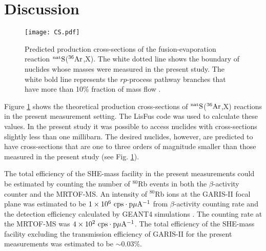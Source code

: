 \documentclass[3p]{elsarticle}
\begin{document}
\section{Discussion}

\begin{figure}[!t]
  \centering
  \texttt{[image: CS.pdf]}
  \caption{Predicted production cross-sections of the fusion-evaporation reaction $^{\rm nat}{\rm S}$($^{36}{\rm Ar}$,X). The white dotted line shows the boundary of nuclides whose masses were measured in the present study. The white bold line represents the $rp$-process pathway branches that have more than 10\% fraction of mass flow \citep{Schatz2001}. \label{CS}}
\end{figure} 

Figure \ref{CS} shows the theoretical production cross-sections of $^{\rm nat}{\rm S}$($^{36}{\rm Ar}$,X) reactions in the present measurement setting. The LisFus code \citep{Tarasov2003} was used to calculate these values. In the present study it was possible to access nuclides with cross-sections slightly less than one millibarn. The desired nuclides, however, are predicted to have cross-sections that are one to three orders of magnitude smaller than those measured in the present study (see Fig. \ref{CS}). 

The total efficiency of the SHE-mass facility in the present measurements could be estimated by counting the number of $^{80}$Rb events in both the $\beta$-activity counter and the MRTOF-MS. An intensity of $^{80}$Rb ions at the GARIS-II focal plane was estimated to be $1 \times 10^{6} \ {\rm cps \cdot p\mu A^{-1} }$ from $\beta$-activity counting rate and the detection efficiency calculated by GEANT4 simulations \citep{Agostinelli2003}. The counting rate at the MRTOF-MS was  $4 \times 10^{2} \ {\rm cps \cdot p\mu A^{-1} }$. The total efficiency of the SHE-mass facility excluding the transmission efficiency of GARIS-II  for the present measurements was estimated to be $\sim$0.03\%.
\end{document}
